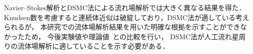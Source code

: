 Navier–Stokes解析とDSMC法による流れ場解析では大きく異なる結果を得た．
Knudsen数を考慮すると連続体近似は破綻しており，DSMC法が適している考えられるが，
本研究での流体場解析結果を用いた明確な根拠を示すことができなかったため，
今後実験値や理論値~\cite{singh2016heat,singh2017aerothermodynamic}との比較を行い，
DSMC法が人工流れ星周りの流体場解析に適していることを示す必要がある．

%
%
%
